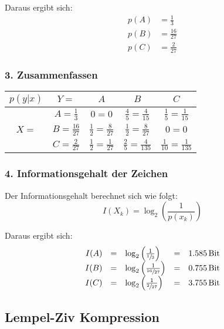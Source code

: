 Daraus ergibt sich:
\begin{align*}
	p(A) &= \frac{1}{3} \\
	p(B) &= \frac{16}{27} \\
	p(C) &= \frac{2}{27}
\end{align*}


\subsubsection*{3. Zusammenfassen}

\begin{tabular}[H]{|c|c|c|c|c|}
	\hline
	$p(y|x)$ & $Y=$ & $A$ & $B$ & $C$ \\
	\hline
	\multirow{3}{*}{$X=$} & $A = \frac{1}{3}$ & $0 = 0$ & $\frac{4}{5} = \frac{4}{15}$ & $\frac{1}{5} = \frac{1}{15}$ \\
	\cline{2-5}
	& $B = \frac{16}{27}$ & $\frac{1}{2} = \frac{8}{27}$ & $\frac{1}{2} = \frac{8}{27}$ & $0 = 0$ \\
	\cline{2-5}
	& $C = \frac{2}{27}$ & $\frac{1}{2} = \frac{1}{27}$ & $\frac{2}{5} = \frac{4}{135}$ & $\frac{1}{10} = \frac{1}{135}$ \\
	\hline
\end{tabular}


\subsubsection*{4. Informationsgehalt der Zeichen}

Der Informationsgehalt berechnet sich wie folgt:
\[
	I(X_k) = \log_2\left(\frac{1}{p(x_k)}\right)
\]

Daraus ergibt sich:
{%
	\renewcommand{\arraystretch}{2}
	\begin{equation*}
		\begin{array}{rclcl}
			I(A) &=& \log_2\left(\frac{1}{\sfrac{1}{3}}\right) &=& 1.585 \, \textrm{Bit} \\
			I(B) &=& \log_2\left(\frac{1}{\sfrac{16}{27}}\right) &=& 0.755 \, \textrm{Bit} \\
			I(C) &=& \log_2\left(\frac{1}{\sfrac{2}{27}}\right) &=& 3.755 \, \textrm{Bit}
		\end{array}
	\end{equation*}
}%


\subsection{Lempel-Ziv Kompression}
\label{example:lempel-ziv}


